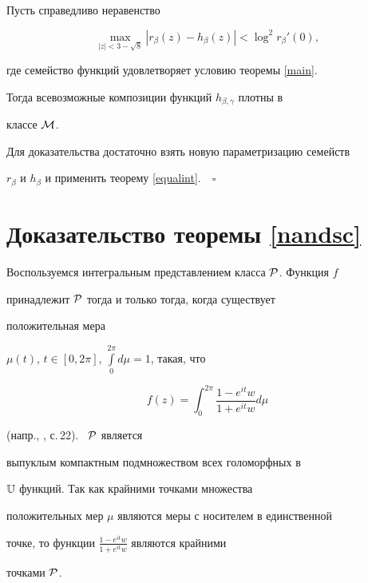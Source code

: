 \begin{cor}\label{newpredfamily} 


Пусть справедливо неравенство


$$


\max\limits_{|z|<3-\sqrt8}|r_\beta(z)-h_\beta(z)|< \log^2


r_\beta'(0),


$$


где семейство функций удовлетворяет условию теоремы \ref{main}.


Тогда всевозможные композиции функций $h_{\beta,\gamma}$ плотны в


классе $\cal M$.


\end{cor}





Для доказательства достаточно взять новую параметризацию семейств


$r_{\beta}$ и $h_\beta$ и применить теорему \ref{equalint}.$\quad\square$





\section{Доказательство теоремы \ref{nandsc}}





Воспользуемся интегральным представлением класса $\cal P$. Функция $f$


принадлежит $\cal P$ тогда и только тогда, когда существует


положительная мера


$\mu(t)$, $t\in[0,2\pi]$, $\int\limits_{0}^{2\pi}d\mu=1$, такая, что


$$


f(z)=\int_{0}^{2\pi}\frac{1-e^{it}w}{1+e^{it}w}d\mu


$$


(напр., \cite{Dur}, с.\,22). \ $\cal P$ является 


выпуклым компактным подмножеством всех голоморфных в


$\Bbb U$ функций. Так как крайними точками множества


положительных мер $\mu$ являются меры с носителем в единственной


точке, то функции $\frac{1-e^{it}w}{1+e^{it}w}$ являются крайними


точками $\cal P$.





